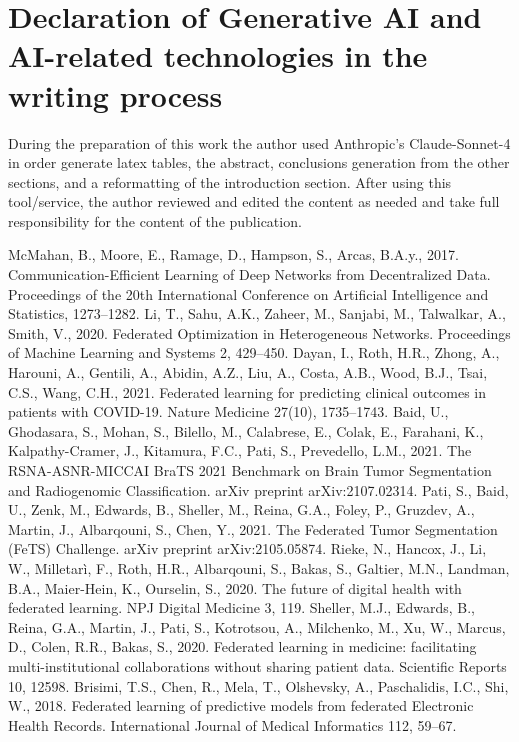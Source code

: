 \documentclass[3p,times,procedia]{elsarticle}
\begin{document}
\section{Declaration of Generative AI and AI-related technologies in the writing process}
During the preparation of this work the author used Anthropic's Claude-Sonnet-4 in order generate latex tables, the abstract, conclusions generation from the other sections, and a reformatting of the introduction section. After using this tool/service, the author reviewed and edited the content as needed and take full responsibility for the content of the publication.

\begin{thebibliography}{10}
 McMahan, B., Moore, E., Ramage, D., Hampson, S., Arcas, B.A.y., 2017. Communication-Efficient Learning of Deep Networks from Decentralized Data. Proceedings of the 20th International Conference on Artificial Intelligence and Statistics, 1273--1282.
 Li, T., Sahu, A.K., Zaheer, M., Sanjabi, M., Talwalkar, A., Smith, V., 2020. Federated Optimization in Heterogeneous Networks. Proceedings of Machine Learning and Systems 2, 429--450.
 Dayan, I., Roth, H.R., Zhong, A., Harouni, A., Gentili, A., Abidin, A.Z., Liu, A., Costa, A.B., Wood, B.J., Tsai, C.S., Wang, C.H., 2021. Federated learning for predicting clinical outcomes in patients with COVID-19. Nature Medicine 27(10), 1735--1743.
 Baid, U., Ghodasara, S., Mohan, S., Bilello, M., Calabrese, E., Colak, E., Farahani, K., Kalpathy-Cramer, J., Kitamura, F.C., Pati, S., Prevedello, L.M., 2021. The RSNA-ASNR-MICCAI BraTS 2021 Benchmark on Brain Tumor Segmentation and Radiogenomic Classification. arXiv preprint arXiv:2107.02314.
 Pati, S., Baid, U., Zenk, M., Edwards, B., Sheller, M., Reina, G.A., Foley, P., Gruzdev, A., Martin, J., Albarqouni, S., Chen, Y., 2021. The Federated Tumor Segmentation (FeTS) Challenge. arXiv preprint arXiv:2105.05874.
 Rieke, N., Hancox, J., Li, W., Milletarì, F., Roth, H.R., Albarqouni, S., Bakas, S., Galtier, M.N., Landman, B.A., Maier-Hein, K., Ourselin, S., 2020. The future of digital health with federated learning. NPJ Digital Medicine 3, 119.
 Sheller, M.J., Edwards, B., Reina, G.A., Martin, J., Pati, S., Kotrotsou, A., Milchenko, M., Xu, W., Marcus, D., Colen, R.R., Bakas, S., 2020. Federated learning in medicine: facilitating multi-institutional collaborations without sharing patient data. Scientific Reports 10, 12598.
 Brisimi, T.S., Chen, R., Mela, T., Olshevsky, A., Paschalidis, I.C., Shi, W., 2018. Federated learning of predictive models from federated Electronic Health Records. International Journal of Medical Informatics 112, 59--67.

\end{thebibliography}
\end{document}
